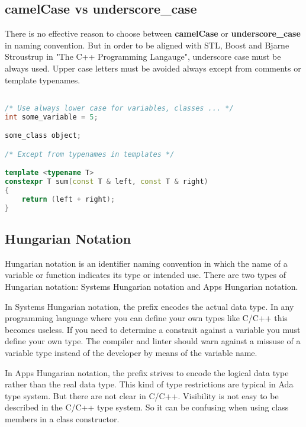\documentclass{article}
\begin{document}
\subsection{camelCase vs underscore\_case}

There is no effective reason to choose between \textbf{camelCase} or \textbf{underscore\_case} in
naming convention. But in order to be aligned with STL, Boost and Bjarne Stroustrup in
"The C++ Programming Langauge", underscore case must be always used. Upper case letters must be
avoided always except from comments or template typenames.

% 

\begin{lstlisting}[language=C++]

/* Use always lower case for variables, classes ... */
int some_variable = 5;

some_class object;

/* Except from typenames in templates */

template <typename T>
constexpr T sum(const T & left, const T & right)
{
	return (left + right);
}
\end{lstlisting}

\subsection{Hungarian Notation}

Hungarian notation is an identifier naming convention in which the name of a variable or function
indicates its type or intended use. There are two types of Hungarian notation: Systems Hungarian
notation and Apps Hungarian notation.

In Systems Hungarian notation, the prefix encodes the actual data type. In any programming language
where you can define your own types like C/C++ this becomes useless. If you need to determine a constrait
against a variable you must define your own type. The compiler and linter should warn against a missuse of
a variable type instead of the developer by means of the variable name.

In Apps Hungarian notation, the prefix strives to encode the logical data type rather than the real data
type. This kind of type restrictions are typical in Ada type system. But there are not clear in C/C++.
Visibility is not easy to be described in the C/C++ type system. So it can be confusing when using class
members in a class constructor.
\end{document}
